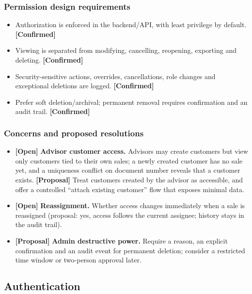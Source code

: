 \documentclass[11pt,a4paper]{article}
\newcommand{\tagconf}{\textcolor{green!45!black}{\textbf{[Confirmed]}}}
\newcommand{\tagprop}{\textcolor{orange!80!black}{\textbf{[Proposal]}}}
\newcommand{\tagopen}{\textcolor{red!70!black}{\textbf{[Open]}}}
\begin{document}
\subsubsection*{Permission design requirements}
\begin{itemize}
	\item Authorization is enforced in the backend/API, with least privilege by
	      default. \tagconf{}
	\item Viewing is separated from modifying, cancelling, reopening, exporting
	      and deleting. \tagconf{}
	\item Security-sensitive actions, overrides, cancellations, role changes and
	      exceptional deletions are logged. \tagconf{}
	\item Prefer soft deletion/archival; permanent removal requires confirmation
	      and an audit trail. \tagconf{}
\end{itemize}

\subsubsection*{Concerns and proposed resolutions}
\begin{itemize}
	\item \tagopen{} \textbf{Advisor customer access.} Advisors may create
	      customers but view only customers tied to their own sales; a newly
	      created
	      customer has no sale yet, and a uniqueness conflict on document number
	      reveals
	      that a customer exists. \tagprop{} Treat customers created by the
	      advisor as
	      accessible, and offer a controlled ``attach existing customer'' flow
	      that
	      exposes minimal data.
	\item \tagopen{} \textbf{Reassignment.} Whether access changes immediately
	      when a sale is reassigned (proposal: yes, access follows the current
	      assignee;
	      history stays in the audit trail).
	\item \tagprop{} \textbf{Admin destructive power.} Require a reason, an
	      explicit confirmation and an audit event for permanent deletion;
	      consider a
	      restricted time window or two-person approval later.
\end{itemize}

\subsection{Authentication}
\end{document}
